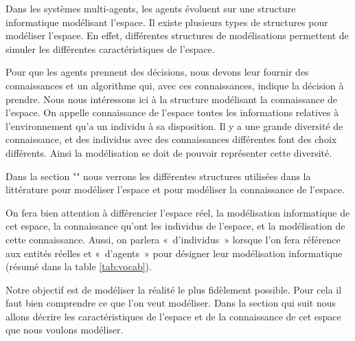 \documentclass[a4paper]{article}
\begin{document}
Dans les systèmes multi-agents, les agents évoluent sur une structure
informatique modélisant l'espace. Il existe plusieurs types de structures pour modéliser l'espace.
En effet, différentes structures de modélisations permettent de simuler les
différentes caractéristiques de l'espace.

Pour que les agents prennent des décisions, nous devons leur fournir des
connaissances et un algorithme qui, avec ces connaissances, indique la décision
à prendre. Nous nous intéressons ici à la structure modélisant la connaissance
de l'espace. On appelle connaissance de l'espace toutes les informations
relatives à l'environnement qu'a un individu à sa disposition. Il y a une grande
diversité de connaissance, et des individus avec des connaissances différentes
font des choix différents. Ainsi la modélisation se doit de pouvoir représenter
cette diversité.

Dans la section "" nous verrons les différentes structures
utilisées dans la littérature pour modéliser l'espace et pour modéliser la
connaissance de l'espace.

On fera bien attention à différencier l'espace réel, la modélisation
informatique de cet espace, la connaissance qu'ont les individus de l'espace, et
la modélisation de cette connaissance. Aussi, on parlera «~d'individus~» lorsque
l'on fera référence aux entités réelles et «~d'agents~» pour désigner leur
modélisation informatique (résumé dans la table \ref{tab:vocab}).

\begin{table}
  \noindent{}
  \caption{Le vocabulaire utilisé, en fonction de si on parle de
  l'environnement réel ou de la modélisation informatique}
  \label{tab:vocab}
\end{table}

Notre objectif est de modéliser la réalité le plus fidèlement possible. Pour
cela il faut bien comprendre ce que l'on veut modéliser. Dans la section qui
suit nous allons décrire les caractéristiques de l'espace et de la connaissance
de cet espace que nous voulons modéliser.
\end{document}
